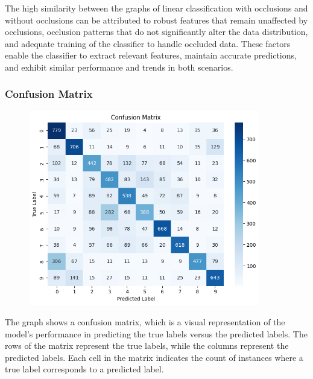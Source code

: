 \documentclass{midl} %
\begin{document}
The high similarity between the graphs of linear classification with occlusions and without occlusions can be attributed to robust features that remain unaffected by occlusions, occlusion patterns that do not significantly alter the data distribution, and adequate training of the classifier to handle occluded data. These factors enable the classifier to extract relevant features, maintain accurate predictions, and exhibit similar performance and trends in both scenarios.

\subsubsection{Confusion Matrix}
\begin{figure}[H]
 \centering
  \includegraphics[width=0.9\textwidth]{confusion_matrix_cifar10.png}\hfill
  \label{fig: confusion matrix - cifar10}
\end{figure}

The graph shows a confusion matrix, which is a visual representation of the model's performance in predicting the true labels versus the predicted labels.
The rows of the matrix represent the true labels, while the columns represent the predicted labels. Each cell in the matrix indicates the count of instances where a true label corresponds to a predicted label.
\end{document}
